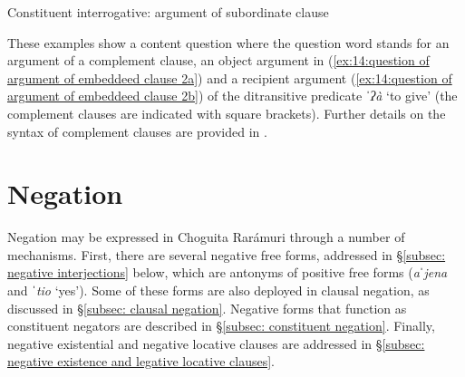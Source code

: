 \ea\label{ex:14:question of argument of embeddeed clause 2}
{Constituent interrogative: argument of subordinate clause}\\
    \label{ex:14:question of argument of embeddeed clause 2a}
        \label{ex:14:question of argument of embeddeed clause 2b}
    \z
\z

These examples show a content question where the question word stands for an argument of a complement clause, an object argument in (\ref{ex:14:question of argument of embeddeed clause 2a}) and a recipient argument (\ref{ex:14:question of argument of embeddeed clause 2b}) of the ditransitive predicate \textit{ˈʔà} `to give' (the complement clauses are indicated with square brackets). Further details on the syntax of complement clauses are provided in .

\section{Negation}
\label{sec: negative constructions}

Negation may be expressed in Choguita Rarámuri through a number of mechanisms. First, there are several negative free forms, addressed in §\ref{subsec: negative interjections} below, which are antonyms of positive free forms (\textit{\textit{aˈjena}} and \textit{ˈtio} `yes'). Some of these forms are also deployed in clausal negation, as discussed in §\ref{subsec: clausal negation}. Negative forms that function as constituent negators are described in §\ref{subsec: constituent negation}. Finally, negative existential and negative locative clauses are addressed in §\ref{subsec: negative existence and legative locative clauses}.

